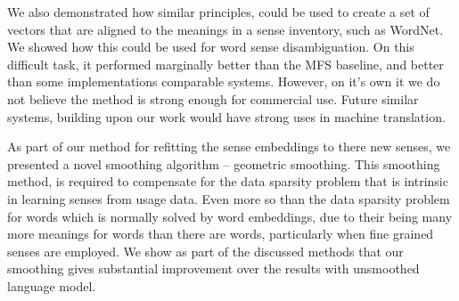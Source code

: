 \documentclass{sig-alternate}
\begin{document}
We also demonstrated how similar principles, could be used to create a set of vectors that are aligned to the meanings in a sense inventory, such as WordNet. We showed how this could be used for word sense disambiguation. On this difficult task, it performed marginally better than the MFS baseline, and better than some implementations comparable systems. However, on it's own it we do not believe the method is strong enough for commercial use. Future similar systems, building upon our work would have strong uses in machine translation.

As part of our method for refitting the sense embeddings to there new senses, we presented a novel smoothing algorithm -- geometric smoothing.
This smoothing method, is required to compensate for the data sparsity problem that is intrinsic in learning senses from usage data. Even more so than the data sparsity problem for words which is normally solved by word embeddings, due to their being many more meanings for words than there are words, particularly when fine grained senses are employed. We show as part of the discussed methods that our smoothing gives substantial improvement over the results with unsmoothed language model.

\newpage
\printbibliography
\end{document}
